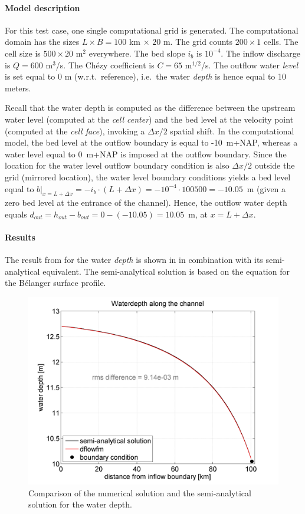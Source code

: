 \paragraph*{Model description}
For this test case, one single computational grid is generated. The computational domain has the sizes $L \times B = 100$ km $\times$ $20$ m. The grid counts $200 \times 1$ cells. The cell size is $500 \times 20$ m$^2$ everywhere. The bed slope $i_b$ is $10^{-4}$. The inflow discharge is $Q = 600$ m$^3$/s. The Ch\'ezy coefficient is $C = 65$ m$^{1/2}$/s. The outflow water \emph{level} is set equal to 0 m (w.r.t.\ reference), i.e.\ the water \emph{depth} is hence equal to 10 meters.

Recall that the water depth is computed as the difference between the upstream water level (computed at the \emph{cell center}) and the bed level at the velocity point (computed at the \emph{cell face}), invoking a $\Delta x/2$ spatial shift. In the computational model, the bed level at the outflow boundary is equal to -10~m+NAP, whereas a water level equal to 0~m+NAP is imposed at the outflow boundary. Since the location for the water level outflow boundary condition is also $\Delta x/2$ outside the grid (mirrored location), the water level boundary conditions yields a bed level equal to $b|_{x = L + \Delta x} = -i_b \cdot (L + \Delta x) = -10^{-4}\cdot 100500 = -10.05$~m (given a zero bed level at the entrance of the channel). Hence, the outflow water depth equals $d_{out} = h_{out} - b_{out} = 0 - (-10.05) = 10.05$~m, at $x = L + \Delta x$.




\paragraph*{Results}
The result from \DFLOWFM for the water \emph{depth} is shown in  in combination with its semi-analytical equivalent. The semi-analytical solution is based on the equation for the B\'elanger surface profile.

\begin{figure}[h!]
\begin{center}
\includegraphics[width=0.8\columnwidth]{figures/waterdepth.png}
\end{center}\caption{Comparison of the numerical solution and the semi-analytical solution for the water depth. \label{fig:belangersingledepth}}
\end{figure}

